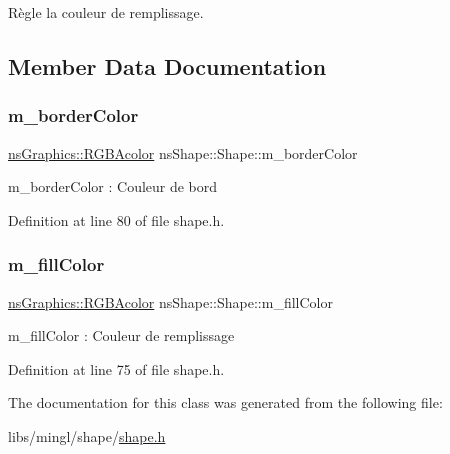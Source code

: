 Règle la couleur de remplissage. 



\subsection{Member Data Documentation}
\mbox{\label{classns_shape_1_1_shape_a0444014e3ee0fa1e6ba5295e530a4f82}} 
\subsubsection{\texorpdfstring{m\+\_\+border\+Color}{m\_borderColor}}
{\footnotesize\ttfamily \hyperlink{classns_graphics_1_1_r_g_b_acolor}{ns\+Graphics\+::\+R\+G\+B\+Acolor} ns\+Shape\+::\+Shape\+::m\+\_\+border\+Color\hspace{0.3cm}{\ttfamily [protected]}}



m\+\_\+border\+Color \+: Couleur de bord 



Definition at line 80 of file shape.\+h.

\mbox{\label{classns_shape_1_1_shape_a68841e117adddc95734dcbaa62f68832}} 
\subsubsection{\texorpdfstring{m\+\_\+fill\+Color}{m\_fillColor}}
{\footnotesize\ttfamily \hyperlink{classns_graphics_1_1_r_g_b_acolor}{ns\+Graphics\+::\+R\+G\+B\+Acolor} ns\+Shape\+::\+Shape\+::m\+\_\+fill\+Color\hspace{0.3cm}{\ttfamily [protected]}}



m\+\_\+fill\+Color \+: Couleur de remplissage 



Definition at line 75 of file shape.\+h.



The documentation for this class was generated from the following file\+:\begin{DoxyCompactItemize}
\item 
libs/mingl/shape/\hyperlink{shape_8h}{shape.\+h}\end{DoxyCompactItemize}
